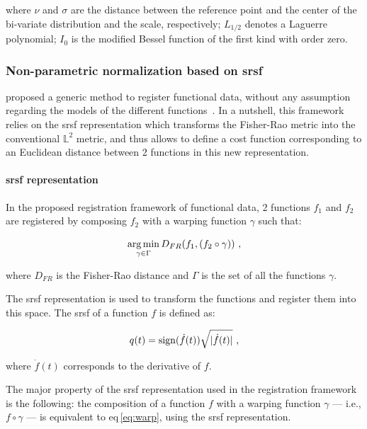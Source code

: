 \noindent where $\nu$ and $\sigma$ are the distance between the reference point and the center of the bi-variate distribution and the scale, respectively; $L_{1/2}$ denotes a Laguerre polynomial; $I_0$ is the modified Bessel function of the first kind with order zero.

\subsubsection{Non-parametric normalization based on \acs*{srsf}}\label{subsubsec:chp5:T2-norm:gen-model}

\citeauthor{Srivastava2011} proposed a generic method to register functional data, without any assumption regarding the models of the different functions~\cite{Srivastava2011}. 
In a nutshell, this framework relies on the \ac{srsf} representation which transforms the Fisher-Rao metric into the conventional $\mathbb{L}^2$ metric, and thus allows to define a cost function corresponding to an Euclidean distance between 2 functions in this new representation.

\paragraph{\Ac{srsf} representation}

In the proposed registration framework of functional data, 2 functions $f_1$ and $f_2$ are registered by composing $f_2$ with a warping function $\gamma$ such that:

\begin{equation}
  \operatorname*{arg\,min}_{\gamma \in \Gamma} D_{FR}(f_1, (f_2 \circ \gamma)) \ ,
  \label{eq:regfun}
\end{equation}

\noindent where $D_{FR}$ is the Fisher-Rao distance and $\Gamma$ is the set of all the functions $\gamma$.

The \ac{srsf} representation is used to transform the functions and register them into this space.
The \ac{srsf} of a function $f$ is defined as:

\begin{equation}
  q(t) = \operatorname*{sign}(\dot{f}(t))\sqrt{|\dot{f}(t)|} \ ,
  \label{eq:srsf}
\end{equation}

\noindent where $\dot{f}(t)$ corresponds to the derivative of $f$.

The major property of the \ac{srsf} representation used in the registration framework is the following: the composition of a function $f$ with a warping function $\gamma$ --- i.e., $f \circ \gamma$ --- is equivalent to \acs{eq}\,\eqref{eq:warp}, using the \ac{srsf} representation.

